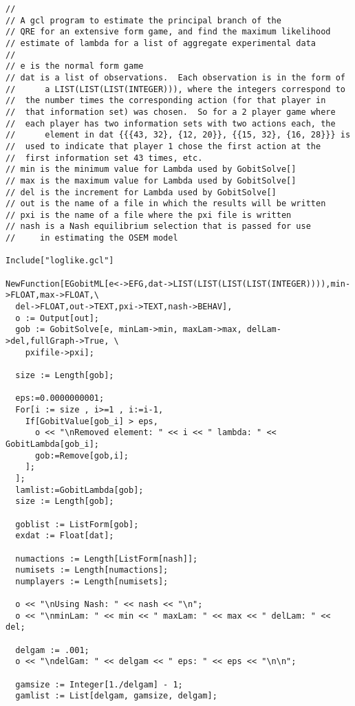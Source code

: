 {\scriptsize
\begin{verbatim}
//
// A gcl program to estimate the principal branch of the 
// QRE for an extensive form game, and find the maximum likelihood 
// estimate of lambda for a list of aggregate experimental data
// 
// e is the normal form game
// dat is a list of observations.  Each observation is in the form of  
//      a LIST(LIST(LIST(INTEGER))), where the integers correspond to
//	the number times the corresponding action (for that player in
//	that information set) was chosen.  So for a 2 player game where
//	each player has two information sets with two actions each, the 
//      element in dat {{{43, 32}, {12, 20}}, {{15, 32}, {16, 28}}} is 
//	used to indicate that player 1 chose the first action at the
//	first information set 43 times, etc.  
// min is the minimum value for Lambda used by GobitSolve[]
// max is the maximum value for Lambda used by GobitSolve[]
// del is the increment for Lambda used by GobitSolve[]
// out is the name of a file in which the results will be written
// pxi is the name of a file where the pxi file is written
// nash is a Nash equilibrium selection that is passed for use
//     in estimating the OSEM model 

Include["loglike.gcl"]

NewFunction[EGobitML[e<->EFG,dat->LIST(LIST(LIST(LIST(INTEGER)))),min->FLOAT,max->FLOAT,\
  del->FLOAT,out->TEXT,pxi->TEXT,nash->BEHAV],
  o := Output[out];
  gob := GobitSolve[e, minLam->min, maxLam->max, delLam->del,fullGraph->True, \
    pxifile->pxi];

  size := Length[gob];

  eps:=0.0000000001;
  For[i := size , i>=1 , i:=i-1,
    If[GobitValue[gob_i] > eps, 
      o << "\nRemoved element: " << i << " lambda: " << GobitLambda[gob_i];
      gob:=Remove[gob,i]; 
    ];
  ];
  lamlist:=GobitLambda[gob];
  size := Length[gob];

  goblist := ListForm[gob];
  exdat := Float[dat];

  numactions := Length[ListForm[nash]];
  numisets := Length[numactions];
  numplayers := Length[numisets];

  o << "\nUsing Nash: " << nash << "\n";
  o << "\nminLam: " << min << " maxLam: " << max << " delLam: " << del;

  delgam := .001;
  o << "\ndelGam: " << delgam << " eps: " << eps << "\n\n";

  gamsize := Integer[1./delgam] - 1;
  gamlist := List[delgam, gamsize, delgam];
  

\end{verbatim}}
